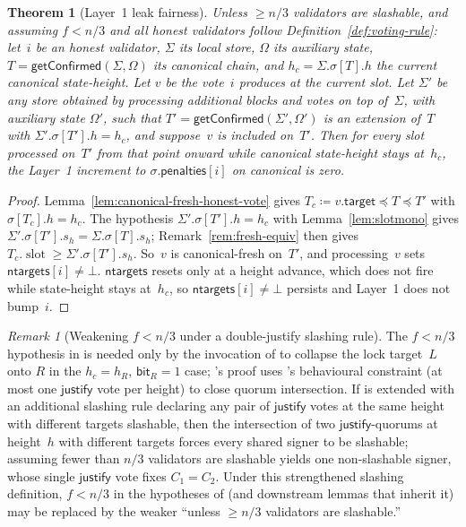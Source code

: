 \documentclass{article}
\newcommand{\slot}[0]{\ensuremath{\operatorname{\mathrm{slot}}}}
\newcommand{\target}{\mathsf{target}}
\newcommand{\just}{\ensuremath{\mathsf{justify}}\xspace}
\newcommand{\ntargets}{\mathsf{ntargets}}
\newcommand{\penalties}{\mathsf{penalties}}
\newcommand{\bit}{\mathsf{bit}}
\newcommand{\getConfirmed}{\textsf{getConfirmed}\xspace}
\theoremstyle{plain}
\newtheorem{theorem}{Theorem}
\theoremstyle{definition}
\theoremstyle{remark}
\newtheorem{remark}{Remark}
\begin{document}
\begin{theorem}[Layer~1 leak fairness]\label{thm:fairness}
Unless $\geq n/3$ validators are slashable, and assuming $f < n/3$ and all honest validators follow Definition~\ref{def:voting-rule}: let~$i$ be an honest validator, $\Sigma$ its local store, $\Omega$ its auxiliary state, $T = \getConfirmed(\Sigma, \Omega)$ its canonical chain, and $h_c = \Sigma.\sigma[T].h$ the current canonical state-height.
Let $v$ be the vote~$i$ produces at the current slot.
Let $\Sigma'$ be any store obtained by processing additional blocks and votes on top of~$\Sigma$, with auxiliary state $\Omega'$, such that $T' = \getConfirmed(\Sigma', \Omega')$ is an extension of~$T$ with $\Sigma'.\sigma[T'].h = h_c$, and suppose~$v$ is included on~$T'$.
Then for every slot processed on~$T'$ from that point onward while canonical state-height stays at~$h_c$, the Layer~1 increment to $\sigma.\penalties[i]$ on canonical is zero.
\end{theorem}

\begin{proof}
Lemma~\ref{lem:canonical-fresh-honest-vote} gives $T_c \coloneqq v.\target \preceq T \preceq T'$ with $\sigma[T_c].h = h_c$.
The hypothesis $\Sigma'.\sigma[T'].h = h_c$ with Lemma~\ref{lem:slotmono} gives $\Sigma'.\sigma[T'].s_h = \Sigma.\sigma[T].s_h$; Remark~\ref{rem:fresh-equiv} then gives $T_c.\slot \geq \Sigma'.\sigma[T'].s_h$.
So~$v$ is canonical-fresh on~$T'$, and processing~$v$ sets $\ntargets[i] \neq \bot$.
$\ntargets$ resets only at a height advance, which does not fire while state-height stays at~$h_c$, so $\ntargets[i] \neq \bot$ persists and Layer~1 does not bump~$i$.
\end{proof}

\begin{remark}[Weakening $f < n/3$ under a double-justify slashing rule]\label{rem:canonical-fresh-slashable}
The $f < n/3$ hypothesis in  is needed only by the invocation of  to collapse the lock target~$L$ onto $R$ in the $h_c = h_R$, $\bit_R = 1$ case; 's proof uses 's behavioural constraint (at most one \just vote per height) to close quorum intersection.
If  is extended with an additional slashing rule declaring any pair of \just votes at the same height with different targets slashable, then the intersection of two \just-quorums at height~$h$ with different targets forces every shared signer to be slashable; assuming fewer than $n/3$ validators are slashable yields one non-slashable signer, whose single \just vote fixes $C_1 = C_2$.
Under this strengthened slashing definition, $f < n/3$ in the hypotheses of  (and downstream lemmas that inherit it) may be replaced by the weaker ``unless $\geq n/3$ validators are slashable.''
\end{remark}
\end{document}
